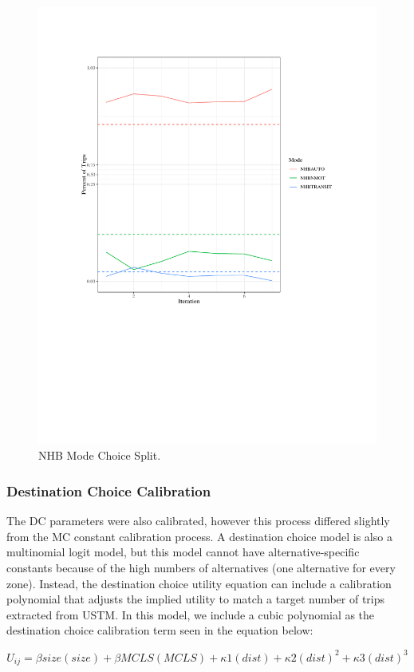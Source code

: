   \begin{figure}

  {\centering \includegraphics[width=0.75\linewidth]{figures/chapter3/nhb_mc.pdf}

  }

  \caption{NHB Mode Choice Split.}\label{fig:nhbmc}
  \end{figure}

\subsubsection{Destination Choice Calibration}

The DC parameters were also calibrated, however this process differed slightly from the MC constant calibration process. A destination choice model is also a multinomial logit model, but this model cannot have alternative-specific constants because of the high numbers of alternatives (one alternative for every zone). Instead, the destination choice utility equation can include a calibration polynomial that adjusts the implied utility to match a target number of trips extracted from USTM. In this model, we include a cubic polynomial as the destination choice calibration term seen in the equation below:

\begin{equation}
	U_{ij}=\beta size(size)+\beta MCLS(MCLS) + \kappa 1(dist)+\kappa2(dist)^2+\kappa3(dist)^3
	\label{eqn:poly}
\end{equation}

